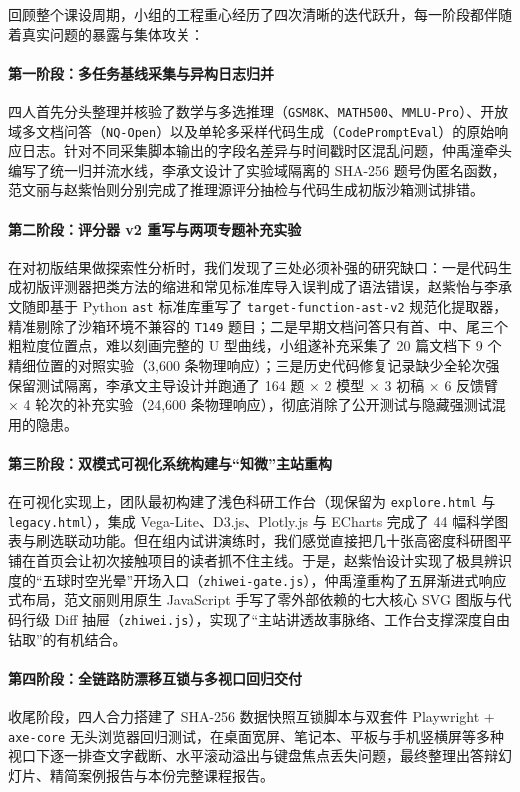 回顾整个课设周期，小组的工程重心经历了四次清晰的迭代跃升，每一阶段都伴随着真实问题的暴露与集体攻关：

\paragraph{第一阶段：多任务基线采集与异构日志归并}四人首先分头整理并核验了数学与多选推理（\texttt{GSM8K}、\texttt{MATH500}、\texttt{MMLU-Pro}）、开放域多文档问答（\texttt{NQ-Open}）以及单轮多采样代码生成（\texttt{CodePromptEval}）的原始响应日志。针对不同采集脚本输出的字段名差异与时间戳时区混乱问题，仲禹潼牵头编写了统一归并流水线，李承文设计了实验域隔离的 SHA-256 题号伪匿名函数，范文丽与赵紫怡则分别完成了推理源评分抽检与代码生成初版沙箱测试排错。

\paragraph{第二阶段：评分器 v2 重写与两项专题补充实验}在对初版结果做探索性分析时，我们发现了三处必须补强的研究缺口：一是代码生成初版评测器把类方法的缩进和常见标准库导入误判成了语法错误，赵紫怡与李承文随即基于 Python \texttt{ast} 标准库重写了 \texttt{target-function-ast-v2} 规范化提取器，精准剔除了沙箱环境不兼容的 \texttt{T149} 题目；二是早期文档问答只有首、中、尾三个粗粒度位置点，难以刻画完整的 U 型曲线，小组遂补充采集了 20 篇文档下 9 个精细位置的对照实验（3,600 条物理响应）；三是历史代码修复记录缺少全轮次强保留测试隔离，李承文主导设计并跑通了 164 题 $\times$ 2 模型 $\times$ 3 初稿 $\times$ 6 反馈臂 $\times$ 4 轮次的补充实验（24,600 条物理响应），彻底消除了公开测试与隐藏强测试混用的隐患。

\paragraph{第三阶段：双模式可视化系统构建与“知微”主站重构}在可视化实现上，团队最初构建了浅色科研工作台（现保留为 \texttt{explore.html} 与 \texttt{legacy.html}），集成 Vega-Lite、D3.js、Plotly.js 与 ECharts 完成了 44 幅科学图表与刷选联动功能。但在组内试讲演练时，我们感觉直接把几十张高密度科研图平铺在首页会让初次接触项目的读者抓不住主线。于是，赵紫怡设计实现了极具辨识度的“五球时空光晕”开场入口（\texttt{zhiwei-gate.js}），仲禹潼重构了五屏渐进式响应式布局，范文丽则用原生 JavaScript 手写了零外部依赖的七大核心 SVG 图版与代码行级 Diff 抽屉（\texttt{zhiwei.js}），实现了“主站讲透故事脉络、工作台支撑深度自由钻取”的有机结合。

\paragraph{第四阶段：全链路防漂移互锁与多视口回归交付}收尾阶段，四人合力搭建了 SHA-256 数据快照互锁脚本与双套件 Playwright + \texttt{axe-core} 无头浏览器回归测试，在桌面宽屏、笔记本、平板与手机竖横屏等多种视口下逐一排查文字截断、水平滚动溢出与键盘焦点丢失问题，最终整理出答辩幻灯片、精简案例报告与本份完整课程报告。

